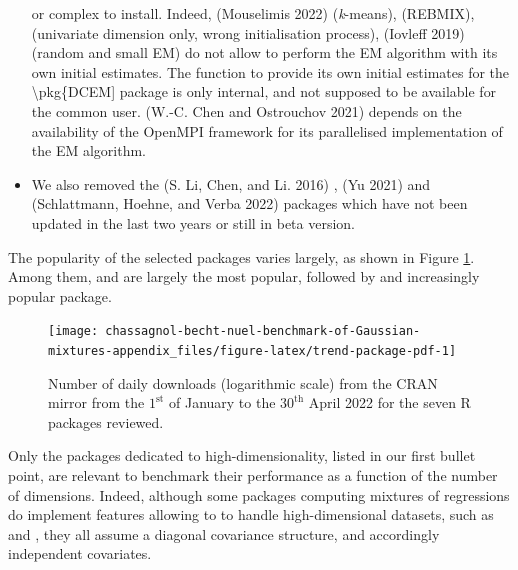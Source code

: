 \begin{itemize}
  or complex to install. Indeed,  (Mouselimis 2022)
  (\emph{k}-means),  (REBMIX),  (univariate
  dimension only, wrong initialisation process), 
  (Iovleff 2019) (random and small EM) do not allow to perform the EM
  algorithm with its own initial estimates. The function to provide its own initial estimates for the \textbackslash pkg\{DCEM{]} package is only internal, and not supposed to be available for the common user.  (W.-C. Chen and Ostrouchov 2021) depends on
  the availability of the OpenMPI framework for its parallelised
  implementation of the EM algorithm.
\item
  We also removed the  (S. Li, Chen, and Li. 2016) ,
   (Yu 2021) and  (Schlattmann, Hoehne, and Verba 2022) packages
  which have not been updated in the last two years or still in beta
  version.
\end{itemize}

The popularity of the selected packages varies largely, as shown in
Figure
\ref{fig:trend-package-pdf}.
Among them,  and  are largely the most popular,
followed by  and increasingly popular 
package.

\begin{figure}

{\centering \texttt{[image: chassagnol-becht-nuel-benchmark-of-Gaussian-mixtures-appendix\_files/figure-latex/trend-package-pdf-1]} 

}

\caption{Number of daily downloads (logarithmic scale) from the CRAN mirror from the $1^\text{st}$ of January to the $30^{\text{th}}$ April 2022 for the seven R packages reviewed.}\label{fig:trend-package-pdf}
\end{figure}

Only the packages dedicated to high-dimensionality, listed in our first bullet point, are relevant to benchmark their performance as a function of the number of dimensions. Indeed, although some packages computing mixtures of regressions do implement features allowing to to handle high-dimensional datasets, such as  and , they all assume a diagonal covariance structure, and accordingly independent covariates.

